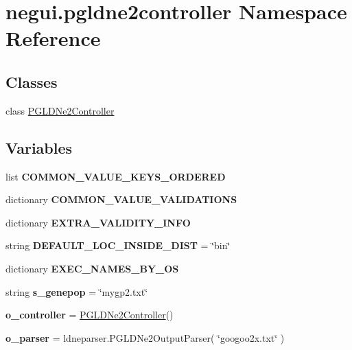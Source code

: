 \hypertarget{namespacenegui_1_1pgldne2controller}{}\section{negui.\+pgldne2controller Namespace Reference}
\label{namespacenegui_1_1pgldne2controller}
\subsection*{Classes}
\begin{DoxyCompactItemize}
\item 
class \hyperlink{classnegui_1_1pgldne2controller_1_1PGLDNe2Controller}{P\+G\+L\+D\+Ne2\+Controller}
\end{DoxyCompactItemize}
\subsection*{Variables}
\begin{DoxyCompactItemize}
\item 
list {\bfseries C\+O\+M\+M\+O\+N\+\_\+\+V\+A\+L\+U\+E\+\_\+\+K\+E\+Y\+S\+\_\+\+O\+R\+D\+E\+R\+ED}
\item 
dictionary {\bfseries C\+O\+M\+M\+O\+N\+\_\+\+V\+A\+L\+U\+E\+\_\+\+V\+A\+L\+I\+D\+A\+T\+I\+O\+NS}
\item 
dictionary {\bfseries E\+X\+T\+R\+A\+\_\+\+V\+A\+L\+I\+D\+I\+T\+Y\+\_\+\+I\+N\+FO}
\item 
string {\bfseries D\+E\+F\+A\+U\+L\+T\+\_\+\+L\+O\+C\+\_\+\+I\+N\+S\+I\+D\+E\+\_\+\+D\+I\+ST} = \char`\"{}bin\char`\"{}\hypertarget{namespacenegui_1_1pgldne2controller_abec34fccc915c657bb8a15e49db40876}{}\label{namespacenegui_1_1pgldne2controller_abec34fccc915c657bb8a15e49db40876}

\item 
dictionary {\bfseries E\+X\+E\+C\+\_\+\+N\+A\+M\+E\+S\+\_\+\+B\+Y\+\_\+\+OS}
\item 
string {\bfseries s\+\_\+genepop} = \char`\"{}mygp2.\+txt\char`\"{}\hypertarget{namespacenegui_1_1pgldne2controller_a6af789f2be8d7f876bdb0f76ba43d265}{}\label{namespacenegui_1_1pgldne2controller_a6af789f2be8d7f876bdb0f76ba43d265}

\item 
{\bfseries o\+\_\+controller} = \hyperlink{classnegui_1_1pgldne2controller_1_1PGLDNe2Controller}{P\+G\+L\+D\+Ne2\+Controller}()\hypertarget{namespacenegui_1_1pgldne2controller_a5b0cfc958fb06f275ce9a41ccdebc1d8}{}\label{namespacenegui_1_1pgldne2controller_a5b0cfc958fb06f275ce9a41ccdebc1d8}

\item 
{\bfseries o\+\_\+parser} = ldneparser.\+P\+G\+L\+D\+Ne2\+Output\+Parser( \char`\"{}googoo2x.\+txt\char`\"{} )\hypertarget{namespacenegui_1_1pgldne2controller_a541c2ea472c717fcff000007e5e93aea}{}\label{namespacenegui_1_1pgldne2controller_a541c2ea472c717fcff000007e5e93aea}

\end{DoxyCompactItemize}


